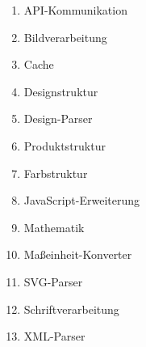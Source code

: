 \begin{enumerate}
    \item API-Kommunikation
    \item Bildverarbeitung
    \item Cache
    \item Designstruktur
    \item Design-Parser
    \item Produktstruktur
    \item Farbstruktur
    \item JavaScript-Erweiterung
    \item Mathematik
    \item Maßeinheit-Konverter
    \item SVG-Parser
    \item Schriftverarbeitung
    \item XML-Parser
\end{enumerate}